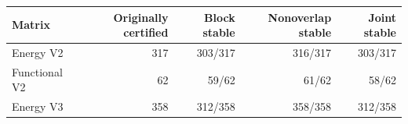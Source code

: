 \begin{tabular}{lrrrr}
\toprule
Matrix & Originally certified & Block stable & Nonoverlap stable & Joint stable \\
\midrule
Energy V2 & 317 & 303/317 & 316/317 & 303/317 \\
Functional V2 & 62 & 59/62 & 61/62 & 58/62 \\
Energy V3 & 358 & 312/358 & 358/358 & 312/358 \\
\bottomrule
\end{tabular}
